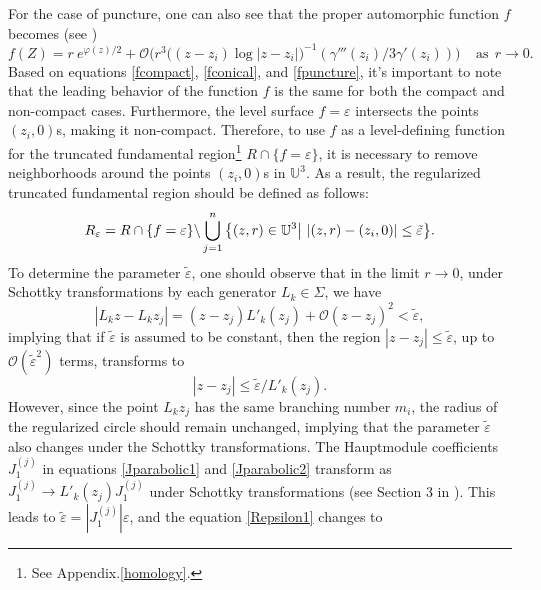\documentclass[a4paper,11pt]{article}
\begin{document}
For the case of puncture, one can also see that the proper automorphic function $f$ becomes 
(see \cite{park2017potentials})
\begin{equation}
f(Z)=r~e^{\varphi(z)/2} +\mathcal{O}\bigg(r^3 \big((z-z_i)\log|z-z_i
|\big)^{-1}(\gamma'''(z_i)/3\gamma'(z_i))\bigg)~~~~~ \text{as} ~~r\rightarrow 0.
\label{fpuncture}
\end{equation}
Based on equations \eqref{fcompact}, \eqref{fconical}, and \eqref{fpuncture}, it's important to note that the leading behavior of the function $f$ is the same for both the compact and non-compact cases. Furthermore, the level surface $f=\varepsilon$ intersects the points $(z_i,0)$s, making it non-compact. Therefore, to use  $f$ as a level-defining function for the truncated fundamental region\footnote{See Appendix.\ref{homology}.} $R\cap\{f=\varepsilon\}$, it is necessary to remove neighborhoods around the points $(z_i,0)$s in $\mathbb{U}^3$. As a result, the regularized truncated fundamental region should be defined as follows:
\begin{equation}
R_{\varepsilon} = R\cap\{f=\varepsilon\}\backslash \bigcup_{j=1}^{n}\big{\{}(z,r)\in\mathbb{U}^3\big| ~|(z,r)-(z_i,0)| \leq \tilde{\varepsilon}\big{\}}.\label{Repsilon1}
\end{equation}
To determine the parameter $\tilde\varepsilon$, one should observe that in the limit $r\rightarrow 0$, under Schottky transformations by each generator $L_k\in\Sigma$, we have
\begin{equation}
|L_k z-L_k z_j| = (z-z_j)L'_k(z_j)+\mathcal{O}(z-z_j)^2 < \tilde\varepsilon,
\end{equation}
implying that if $\tilde\varepsilon$ is assumed to be constant, then the region $|z - z_j| \leq \tilde\varepsilon$, up to $\mathcal{O}(\tilde\varepsilon^2)$ terms, transforms to
\begin{equation}
|z-z_j| \leq  \tilde\varepsilon/L'_k(z_j).    
\end{equation}
However, since the point $L_k z_j$ has the same branching number $m_i$, the radius of the regularized circle should remain unchanged, implying that the parameter $\tilde\varepsilon$ also changes under the Schottky transformations. The Hauptmodule coefficients $J_1^{(j)}$ in equations \eqref{Jparabolic1} and \eqref{Jparabolic2} transform as $J_1^{(j)} \rightarrow L'_k(z_j) J_1^{(j)}$ under Schottky transformations (see Section 3 in \cite{Taghavi2024classical}). This leads to $\tilde\varepsilon = \left|J_1^{(j)}\right| \varepsilon$, and the equation \eqref{Repsilon1} changes to
\end{document}

